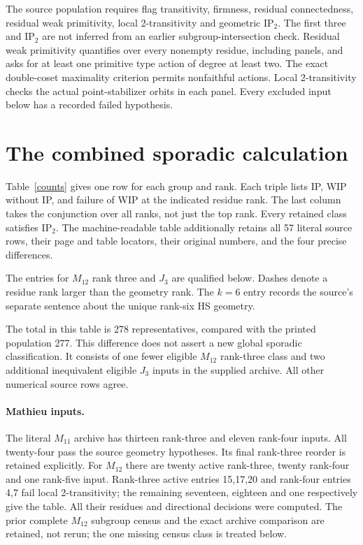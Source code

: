\documentclass[11pt,a4paper]{article}
\begin{document}
The source population requires flag transitivity, firmness, residual
connectedness, residual weak primitivity, local 2-transitivity and
geometric $\mathrm{IP}_2$. The first three and $\mathrm{IP}_2$ are not
inferred from an earlier subgroup-intersection check. Residual weak
primitivity quantifies over every nonempty residue, including panels,
and asks for at least one primitive type action of degree at least two.
The exact double-coset maximality criterion permits nonfaithful actions.
Local 2-transitivity checks the actual point-stabilizer orbits in each
panel. Every excluded input below has a recorded failed hypothesis.

\section{The combined sporadic calculation}
Table~\ref{counts} gives one row for each group and rank. Each triple
lists IP, WIP without IP, and failure of WIP at the indicated residue
rank. The last column takes the conjunction over all ranks, not just
the top rank. Every retained class satisfies $\mathrm{IP}_2$.
The machine-readable table additionally retains all 57 literal source
rows, their page and table locators, their original numbers, and the
four precise differences.

\begin{center}\small

\end{center}
\noindent The entries
for $M_{12}$ rank three and $J_3$ are qualified below. Dashes denote a
residue rank larger than the geometry rank. The $k=6$ entry records the
source's separate sentence about the unique rank-six HS geometry.

The total in this table is 278 representatives, compared with the printed
population 277. This difference does not assert a new global sporadic
classification. It consists of one fewer eligible $M_{12}$ rank-three
class and two additional inequivalent eligible $J_3$ inputs in the
supplied archive. All other numerical source rows agree.

\paragraph{Mathieu inputs.}
The literal $M_{11}$ archive has thirteen rank-three and eleven rank-four
inputs. All twenty-four pass the source geometry hypotheses. Its final
rank-three reorder is retained explicitly. For $M_{12}$ there are twenty
active rank-three, twenty rank-four and one rank-five input. Rank-three
active entries 15,17,20 and rank-four entries 4,7 fail local
2-transitivity; the remaining seventeen, eighteen and one respectively
give the table. All their residues and directional decisions were
computed. The prior complete $M_{12}$ subgroup census and the exact
archive comparison are retained, not rerun; the one missing census
class is treated below.
\end{document}
